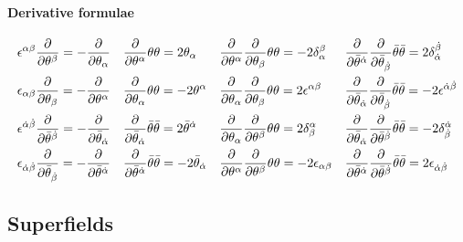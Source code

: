 \documentclass[CheatSheet]{subfiles}
\begin{document}
\paragraph{Derivative formulae}

\begin{align*}
&
\epsilon^{\alpha\beta}\frac{\partial}{\partial\theta^\beta}=-\frac{\partial}{\partial\theta_\alpha}
&&
\frac{\partial}{\partial \theta^{\alpha}}\theta \theta =2 \theta_{\alpha}
&&
\frac{\partial}{\partial \theta^{\alpha}}\frac{\partial}{\partial \theta_{\beta}}\theta \theta =-2 \delta^{\beta}_{\alpha}
&&
\frac{\partial}{\partial \bar\theta^{{\dot\alpha}}}\frac{\partial}{\partial \bar\theta_{{\dot\beta}}}\bar\theta\bar\theta=2 \delta^{{\dot\beta}}_{{\dot\alpha}}
\\&
\epsilon_{\alpha\beta}\frac{\partial}{\partial\theta_\beta}=-\frac{\partial}{\partial\theta^\alpha}
&&
\frac{\partial}{\partial \theta_{\alpha}}\theta \theta =-2 \theta^{\alpha}
&&
\frac{\partial}{\partial \theta_{\alpha}}\frac{\partial}{\partial \theta_{\beta}}\theta \theta =2 \epsilon^{\alpha \beta}
&&
\frac{\partial}{\partial \bar\theta_{{\dot\alpha}}}\frac{\partial}{\partial \bar\theta_{{\dot\beta}}}\bar\theta\bar\theta=-2 \epsilon^{{\dot\alpha}{\dot\beta}}
\\&
\epsilon^{{\dot\alpha}{\dot\beta}}\frac{\partial}{\partial\bar\theta^{\dot\beta}}=-\frac{\partial}{\partial\bar\theta_{\dot\alpha}}
&&
\frac{\partial}{\partial \bar\theta_{{\dot\alpha}}}\bar\theta\bar\theta=2 \bar\theta^{{\dot\alpha}}
&&
\frac{\partial}{\partial \theta_{\alpha}}\frac{\partial}{\partial \theta^{\beta}}\theta \theta =2 \delta^{\alpha}_{\beta}
&&
\frac{\partial}{\partial \bar\theta_{{\dot\alpha}}}\frac{\partial}{\partial \bar\theta^{{\dot\beta}}}\bar\theta\bar\theta=-2 \delta^{{\dot\alpha}}_{{\dot\beta}}
\\&
\epsilon_{{\dot\alpha}{\dot\beta}}\frac{\partial}{\partial\bar\theta_{\dot\beta}}=-\frac{\partial}{\partial\bar\theta^{\dot\alpha}}
&&
\frac{\partial}{\partial \bar\theta^{{\dot\alpha}}}\bar\theta\bar\theta=-2 \bar\theta_{{\dot\alpha}}
&&
\frac{\partial}{\partial \theta^{\alpha}}\frac{\partial}{\partial \theta^{\beta}}\theta \theta =-2 \epsilon_{\alpha \beta}
&&
\frac{\partial}{\partial \bar\theta^{{\dot\alpha}}}\frac{\partial}{\partial \bar\theta^{{\dot\beta}}}\bar\theta\bar\theta=2 \epsilon_{{\dot\alpha}{\dot\beta}}
\end{align*}

\subsection{Superfields}
\end{document}
